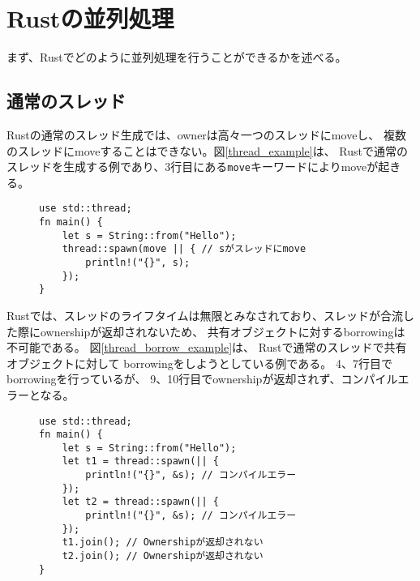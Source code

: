 \documentclass{sumiilab-paper}
\theoremstyle{mystyle}
\numberwithin{definition}{chapter} %
\begin{document}
\section{Rustの並列処理}
まず、Rustでどのように並列処理を行うことができるかを述べる。
\subsection{通常のスレッド}
Rustの通常のスレッド生成では、ownerは高々一つのスレッドにmoveし、
複数のスレッドにmoveすることはできない。図\ref{thread_example}は、
Rustで通常のスレッドを生成する例であり、3行目にある\texttt{move}キーワードによりmoveが起きる。
\begin{figure}[htp]
\begin{lstlisting}[caption=Rustでの通常のスレッド生成の例, 
  label=thread_example, captionpos=b]
use std::thread;
fn main() {
    let s = String::from("Hello");
    thread::spawn(move || { // sがスレッドにmove
        println!("{}", s);
    });
}
\end{lstlisting}
\end{figure}

Rustでは、スレッドのライフタイムは無限とみなされており、スレッドが合流した際にownershipが返却されないため、
共有オブジェクトに対するborrowingは不可能である。
図\ref{thread_borrow_example}は、
Rustで通常のスレッドで共有オブジェクトに対して
borrowingをしようとしている例である。
4、7行目でborrowingを行っているが、
9、10行目でownershipが返却されず、コンパイルエラーとなる。
\begin{figure}[htp]
\begin{lstlisting}[caption=通常のスレッドでborrowingができない例, 
  label=thread_borrow_example, captionpos=b]
use std::thread;
fn main() {
    let s = String::from("Hello");
    let t1 = thread::spawn(|| {
        println!("{}", &s); // コンパイルエラー
    });
    let t2 = thread::spawn(|| {
        println!("{}", &s); // コンパイルエラー
    });
    t1.join(); // Ownershipが返却されない
    t2.join(); // Ownershipが返却されない
}
\end{lstlisting}
\end{figure}
\end{document}
